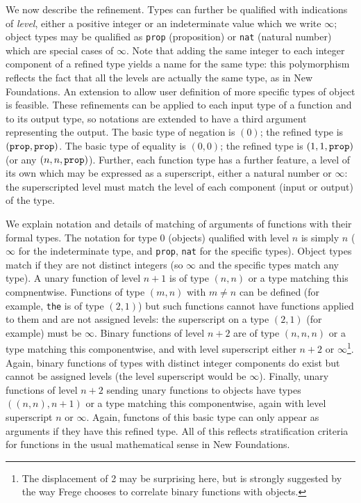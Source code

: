 \documentclass{article}
\begin{document}
{{We now describe the refinement.  Types can further be qualified with indications of {\em level\/}, either a positive integer or an indeterminate value which we write $\infty$; object types may be qualified as {\tt prop} (proposition) or {\tt nat} (natural number) which are special cases of $\infty$.  Note that adding the same integer to each integer component of a refined type yields a name for the same type:  this polymorphism reflects the fact that all the levels are actually the same type, as in New Foundations.  An extension to allow user definition of more specific types of object is feasible.  These refinements can be applied to each input type of a function and to its output type, so notations are extended to have a third argument representing the output.  The basic type of negation is $(0)$;  the refined type is $({\tt prop},{\tt prop})$.  The basic type of equality is $(0,0)$;  the refined type is $(1,1,{\tt prop})$ (or any $(n,n,{\tt prop})$).  Further, each function type has a further feature, a level of its own which may be expressed as a superscript, either a natural number or $\infty$:  the superscripted level must match the level of each component (input or output) of the type.

We explain notation and details of matching of arguments of functions with their formal types.  The notation for type 0 (objects) qualified with level $n$ is simply $n$ ($\infty$ for the indeterminate type, and {\tt prop}, {\tt nat} for the specific types).  Object types match if they are not distinct integers (so $\infty$  and the specific types match any type).   A unary function of level $n+1$ is of type $(n,n)$ or a type matching this compnentwise.  Functions of type
$(m,n)$ with $m \neq n$ can be defined (for example, {\tt the} is of type $(2,1)$) but such functions cannot have functions applied to them and are not assigned levels:  the superscript on a type $(2,1)$ (for example) must be $\infty$.  Binary functions of level $n+2$ are of type $(n,n,n)$ or a type matching this componentwise, and with level superscript either $n+2$ or $\infty$\footnote{The displacement of 2 may be surprising here, but is strongly suggested by the way Frege chooses to correlate binary functions with objects.}. Again, binary functions of types with distinct integer components do exist but cannot be assigned levels (the level superscript would be $\infty$).  Finally, unary functions of level $n+2$ sending unary functions to objects
have types $((n,n),n+1)$ or a type matching this componentwise, again with level superscript $n$ or $\infty$.   Again, functons of this basic type can only appear as arguments if they have this refined type.  All of this reflects stratification criteria for functions in the usual mathematical sense in New Foundations.

}}
\end{document}
